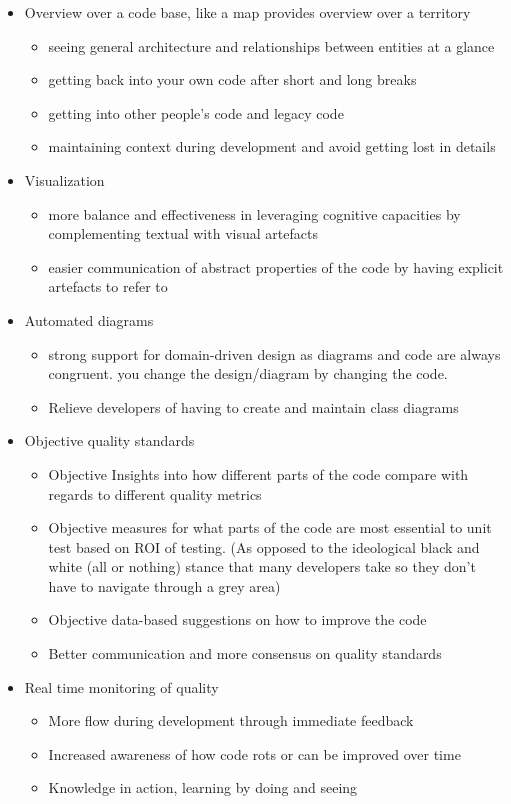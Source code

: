 \documentclass{article}
\begin{document}
\begin{itemize}
	\item Overview over a code base, like a map provides overview over a territory
	\begin{itemize}
		\item seeing general architecture and relationships between entities at a glance
		\item getting back into your own code after short and long breaks
		\item getting into other people's code and legacy code
		\item maintaining context during development and avoid getting lost in details
	\end{itemize}
	\item Visualization
	\begin{itemize}
		\item more balance and effectiveness in leveraging cognitive capacities by complementing textual with visual artefacts
		\item easier communication of abstract properties of the code by having explicit artefacts to refer to 
	\end{itemize}
	\item Automated diagrams
	\begin{itemize}
		\item strong support for domain-driven design as diagrams and code are always congruent. you change the design/diagram by changing the code.
		\item Relieve developers of having to create and maintain class diagrams
	\end{itemize}
	\item Objective quality standards
	\begin{itemize}
		\item Objective Insights into how different parts of the code compare with regards to different quality metrics
		\item Objective measures for what parts of the code are most essential to unit test based on ROI of testing. (As opposed to the ideological black and white (all or nothing) stance that many developers take so they don't have to navigate through a grey area)
		\item Objective data-based suggestions on how to improve the code
		\item Better communication and more consensus on quality standards
	\end{itemize}
	\item Real time monitoring of quality
	\begin{itemize}
		\item More flow during development through immediate feedback
		\item Increased awareness of how code rots or can be improved over time
		\item Knowledge in action, learning by doing and seeing
	\end{itemize}
\end{itemize}
\end{document}
